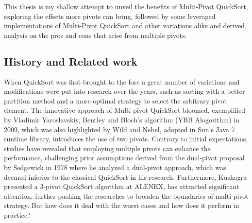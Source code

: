 \documentclass[a4paper,oneside,12pt]{book}
\begin{document}
This thesis is my shallow attempt to unveil the benefits of Multi-Pivot QuickSort, exploring the effects more pivots can bring,
followed by some leveraged implementations of Multi-Pivot QuickSort and other variations alike and derived, analysis on the pros and cons that arise from multiple pivots.

\subsection{History and Related work}

When QuickSort was first brought to the fore a great number of variations and modifications were put into research over the years,
such as sorting with a better partition method and a more optimal strategy to select the arbitrary pivot element.
The innovative approach of Multi-pivot QuickSort bloomed, exemplified by Vladimir Yaroslavskiy\cite{Yaroslavskiy},
Bentley and Bloch's algorithm (YBB Alogorithm) in 2009, which was also highlighted by Wild and Nebel, adopted in Sun's Java 7 runtime library, 
introduces the use of two pivots. Contrary to initial expectations, studies have revealed that employing multiple pivots can enhance the performance,
challenging prior assumptions derived from the dual-pivot proposal by Sedgewick \cite{Sedgewick} in 1978 where he analyzed a dual-pivot approach, 
which was deemed inferior to the classical QuickSort in his research. Furthermore, Kushagra presented a 3-pivot QuickSort \cite{Kushagra} algorithm at ALENEX,
has attracted significant attention, further pushing the researches to broaden the boundaries of multi-pivot strategy. But how does it deal with the worst cases and how does it perform in practice? 
\end{document}
